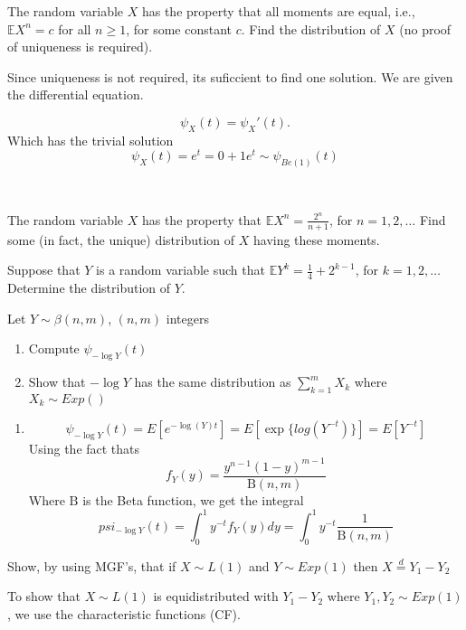 \begin{enumerate}[label=(\alph*)]
\problem %
The random variable $X$ has the property that all moments are equal, i.e., $\mathbb{E}X^n = c$ for all $n \geq 1$, for some constant $c$. Find the distribution of $X$ (no proof of uniqueness is required).

\solution Since uniqueness is not required, its suficcient to find one solution. We are given the differential equation.

\[
\psi_X(t) = \psi_X'(t).
\]
Which has the trivial solution \[
    \psi_X(t) = e^t = 0 + 1e^t \sim \psi_{Be(1)}(t)
\]


\

\problem %
The random variable $X$ has the property that $\mathbb{E}X^n = \frac{2^n}{n+1}$, for $n = 1, 2, \dots$ Find some (in fact, the unique) distribution of $X$ having these moments.

\problem %
Suppose that $Y$ is a random variable such that $\mathbb{E}Y^k = \frac{1}{4} + 2^{k-1}$, for $k = 1, 2, \dots$ Determine the distribution of $Y$.

\problem %
Let $Y \sim \beta(n,m)$, $(n, m)$ integers 
\begin{enumerate}
    \item Compute $ \psi_{-\log Y}(t)$
    \item Show that $-\log Y$ has the same distribution as $\sum_{k=1}^{m}X_k$ where $X_k \sim Exp()$
\end{enumerate}







\solution

\begin{enumerate}
    \item \[
        \psi_{-\log Y}(t) =  E[e^{-\log(Y)t}] = E[\exp\{log(Y^{-t})\}] = E[Y^{-t}]
    \]
    Using the fact thats
    \[f_Y(y)=\frac{y^{n-1}(1-y)^{m-1}}{ \mathrm{B}(n,m)}
    \] 
    Where $ \mathrm {B}$ is the Beta function, we get the integral
\[
    psi_{-\log Y}(t) = \int_{0}^{1} y^{-t} f_Y(y) dy  = \int_{0}^{1} y^{-t} \frac{1}{\mathrm{B}(n,m)}
\]

\end{enumerate}

\problem Show, by using MGF's, that if $X \sim L(1)$ and $Y \sim Exp(1)$ then $X \overset{d}{=} Y_1 - Y_2$




To show that $X \sim L(1)$ is equidistributed with $Y_1 - Y_2$ where $Y_1, Y_2 \sim Exp(1)$, we use the characteristic functions (CF).


\end{enumerate}
